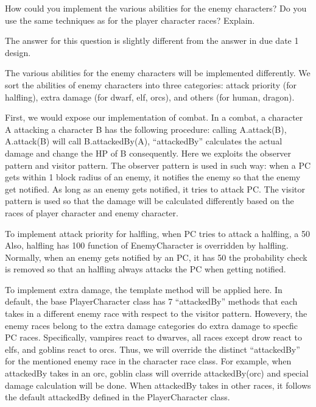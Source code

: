 \documentclass[11pt]{article}
\theoremstyle{plain} \newtheorem{theorem*}{Theorem}[subsection]
\begin{document}
How could you implement the various abilities for the enemy characters? Do you
use the same techniques as for the player character races? Explain. 

The answer for this question is slightly different from the answer in due date
1 design. 

The various abilities for the enemy characters will be implemented differently.
We sort the abilities of enemy characters into three categories: attack
priority (for halfling), extra damage (for dwarf, elf, orcs), and others (for
human, dragon).  

First, we would expose our implementation of combat. In a combat, a character A
attacking a character B has the following procedure: calling A.attack(B),
A.attack(B) will call B.attackedBy(A), “attackedBy” calculates the actual
damage and change the HP of B consequently. Here we exploits the observer
pattern and visitor pattern. The observer pattern is used in such way: when a
PC gets within 1 block radius of an enemy, it notifies the enemy so that the
enemy get notified. As long as an enemy gets notified, it tries to attack PC.
The visitor pattern is used so that the damage will be calculated differently
based on the races of player character and enemy character. 

To implement attack priority for halfling, when PC tries to attack a halfling,
a 50%
Also, halfling has 100%
function of EnemyCharacter is overridden by halfling. Normally, when an enemy
gets notified by an PC, it has 50%
the probability check is removed so that an halfling always attacks the PC when
getting notified. 

To implement extra damage, the template method will be applied here. In
default, the base PlayerCharacter class has 7 “attackedBy” methods that each
takes in a different enemy race with respect to the visitor pattern. Howevery,
the enemy races belong to the extra damage categories do extra damage to
specfic PC races. Specifically, vampires react to dwarves, all races except
drow react to elfs, and goblins react to orcs. Thus, we will override the
distinct “attackedBy” for the mentioned enemy race in the character race class.
For example,  when attackedBy takes in an orc, goblin class will override
attackedBy(orc) and special damage calculation will be done. When attackedBy
takes in other races, it follows the default attackedBy defined in the
PlayerCharacter class. 
\end{document}
